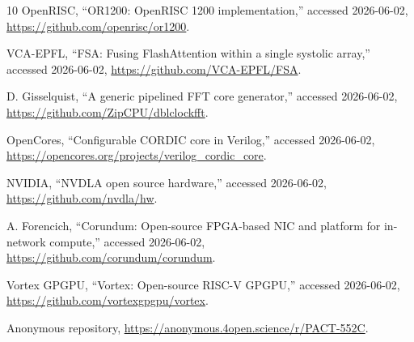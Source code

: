 \documentclass[conference]{IEEEtran}
\begin{document}
\begin{thebibliography}{10}
{OpenRISC}, ``{OR1200}: {OpenRISC} 1200 implementation,'' accessed
2026-06-02, \url{https://github.com/openrisc/or1200}.

{VCA-EPFL}, ``{FSA}: Fusing {FlashAttention} within a single systolic
array,'' accessed 2026-06-02, \url{https://github.com/VCA-EPFL/FSA}.

D. Gisselquist, ``A generic pipelined {FFT} core generator,'' accessed
2026-06-02, \url{https://github.com/ZipCPU/dblclockfft}.

{OpenCores}, ``Configurable {CORDIC} core in {Verilog},'' accessed
2026-06-02, \url{https://opencores.org/projects/verilog_cordic_core}.

{NVIDIA}, ``{NVDLA} open source hardware,'' accessed 2026-06-02,
\url{https://github.com/nvdla/hw}.

A. Forencich, ``Corundum: Open-source {FPGA}-based {NIC} and platform
for in-network compute,'' accessed 2026-06-02,
\url{https://github.com/corundum/corundum}.

{Vortex GPGPU}, ``Vortex: Open-source {RISC-V} {GPGPU},'' accessed
2026-06-02, \url{https://github.com/vortexgpgpu/vortex}.


Anonymous repository,
\url{https://anonymous.4open.science/r/PACT-552C}.



\end{thebibliography}
\end{document}
